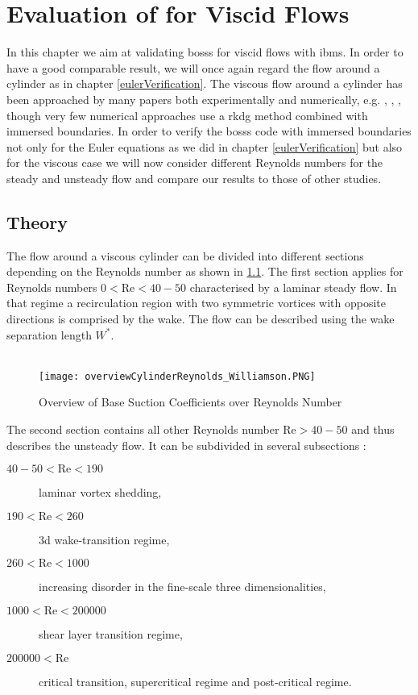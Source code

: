 \chapter{Evaluation of  for Viscid Flows}
\label{viscousCylinder}
In this chapter we aim at validating \gls{bosss} for viscid flows with \gls{ibm}s. In order to have a good comparable result, we will once again regard the flow around a cylinder as in chapter \cref{eulerVerification}. 
The viscous flow around a cylinder has been approached by many papers both experimentally and numerically, e.g. \textcite{williamson1996vortex}, \textcite{FLM:14223}, \textcite{canutoTaira}, though very few numerical approaches use a \gls{rkdg} method combined with immersed boundaries. In order to verify the \gls{bosss} code with immersed boundaries not only for the Euler equations as we did in chapter \cref{eulerVerification} but also for the viscous case we will now consider different Reynolds numbers for the steady and unsteady flow and compare our results to those of other studies.

\section{Theory}
	The flow around a viscous cylinder can be divided into different sections depending on the Reynolds number as shown in \cref{fig:overview}. The first section applies for Reynolds numbers $0 < \text{Re} < 40-50$ characterised by a laminar steady flow. In that regime a recirculation region with two symmetric vortices with opposite directions is comprised by the wake. The flow can be described using the wake separation length $W^*$.\\\\
	\begin{figure}[htp]
		\centering
		\texttt{[image: overviewCylinderReynolds\_Williamson.PNG]}
		\caption{Overview of Base Suction Coefficients over Reynolds Number \cite{williamson1996vortex}}
		\label{fig:overview}
	\end{figure} 
	The second section contains all other Reynolds number $\text{Re}> 40-50$ and thus describes the unsteady flow. It can be subdivided in several subsections \cite{williamson1996vortex}:
	\begin{description}
		\item[$40-50 < \text{Re} < 190$] laminar vortex shedding,
		\item[$190 < \text{Re} < 260$] \gls{3d} wake-transition regime,
		\item[$260 < \text{Re} < 1000$] increasing disorder in the fine-scale three dimensionalities,
		\item[$1000 < \text{Re} < 200000$] shear layer transition regime,
		\item[$200000 < \text{Re}$] critical transition, supercritical regime and post-critical regime.
	\end{description}
	
